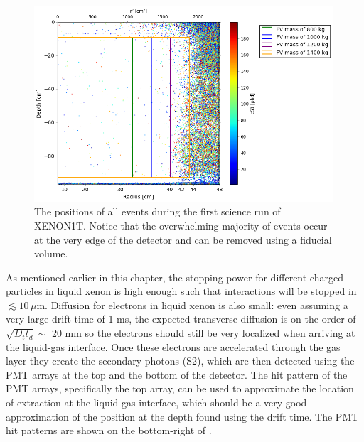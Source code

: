  \begin{figure}[t]
	\centering
	\includegraphics[width=0.99\textwidth]{tpc_pos_rec}
	\caption{The positions of all events during the first science run of XENON1T.  Notice that the overwhelming majority of events occur at the very edge of the detector and can be removed using a fiducial volume.}
	\label{fig:tpc_pos_rec}
\end{figure}

As mentioned earlier in this chapter, the stopping power for different charged particles in liquid xenon is high enough such that interactions will be stopped in $\lesssim 10 \, \mu \textrm{m}$.  Diffusion for electrons in liquid xenon is also small: even assuming a very large drift time of 1 ms, the expected transverse diffusion is on the order of $\sqrt{D_t t_d} \sim$ 20 mm so the electrons should still be very localized when arriving at the liquid-gas interface.  Once these electrons are accelerated through the gas layer they create the secondary photons (S2), which are then detected using the PMT arrays at the top and the bottom of the detector.  The hit pattern of the PMT arrays, specifically the top array, can be used to approximate the location of extraction at the liquid-gas interface, which should be a very good approximation of the position at the depth found using the drift time.  The PMT hit patterns are shown on the bottom-right of .

